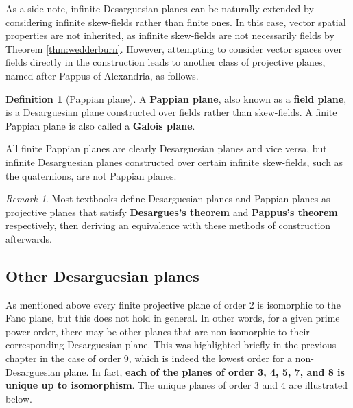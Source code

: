 \documentclass{report}
\theoremstyle{definition}\newtheorem*{definition}{Definition}
\theoremstyle{definition}\newtheorem*{example}{Example}
\theoremstyle{remark}\newtheorem*{remark}{Remark}
\begin{document}
As a side note, infinite Desarguesian planes can be naturally extended by considering infinite skew-fields rather than finite ones. In this case, vector spatial properties are not inherited, as infinite skew-fields are not necessarily fields by Theorem \ref{thm:wedderburn}. However, attempting to consider vector spaces over fields directly in the construction leads to another class of projective planes, named after Pappus of Alexandria, as follows.

\begin{definition}[Pappian plane]
A \textbf{Pappian plane}, also known as a \textbf{field plane}, is a Desarguesian plane constructed over fields rather than skew-fields. A finite Pappian plane is also called a \textbf{Galois plane}.
\end{definition}

All finite Pappian planes are clearly Desarguesian planes and vice versa, but infinite Desarguesian planes constructed over certain infinite skew-fields, such as the quaternions, are not Pappian planes.

\begin{remark}
Most textbooks define Desarguesian planes and Pappian planes as projective planes that satisfy \textbf{Desargues's theorem} and \textbf{Pappus's theorem} respectively, then deriving an equivalence with these methods of construction afterwards.
\end{remark}

\subsection{Other Desarguesian planes}

As mentioned above every finite projective plane of order 2 is isomorphic to the Fano plane, but this does not hold in general. In other words, for a given prime power order, there may be other planes that are non-isomorphic to their corresponding Desarguesian plane. This was highlighted briefly in the previous chapter in the case of order 9, which is indeed the lowest order for a non-Desarguesian plane. In fact, \textbf{each of the planes of order 3, 4, 5, 7, and 8 is unique up to isomorphism}. The unique planes of order 3 and 4 are illustrated below.
\end{document}
